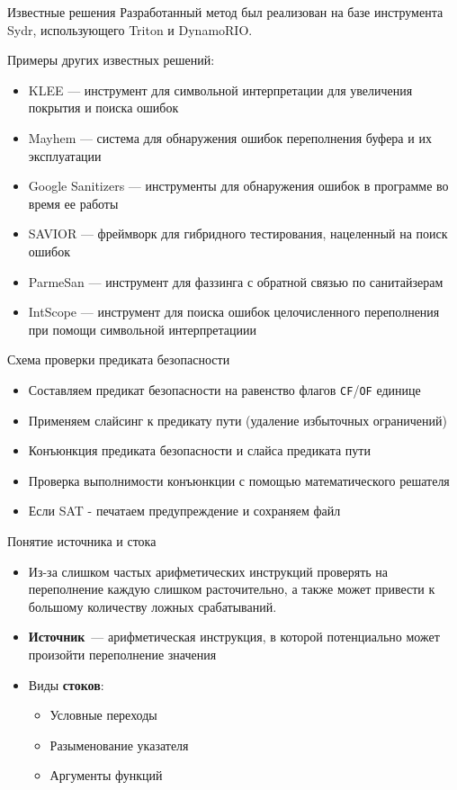 \documentclass[10pt]{beamer}
\begin{document}
\begin{frame}{Известные решения}
Разработанный метод был реализован на базе инструмента Sydr, использующего
Triton и DynamoRIO.

Примеры других известных решений:
\begin{itemize}
    \item KLEE --- инструмент для символьной интерпретации для увеличения
        покрытия и поиска ошибок
    \item Mayhem --- система для обнаружения ошибок переполнения буфера и их
        эксплуатации
    \item Google Sanitizers --- инструменты для обнаружения ошибок в программе
        во время ее работы
    \item SAVIOR --- фреймворк для гибридного тестирования, нацеленный на поиск
        ошибок
    \item ParmeSan --- инструмент для фаззинга с обратной связью по санитайзерам
    \item IntScope --- инструмент для поиска ошибок целочисленного переполнения
        при помощи символьной интерпретациии
\end{itemize}
\end{frame}

\begin{frame}{Схема проверки предиката безопасности}
\begin{itemize}
    \item Составляем предикат безопасности на равенство флагов
        \texttt{CF}/\texttt{OF} единице
    \item Применяем слайсинг к предикату пути (удаление избыточных ограничений)
    \item Конъюнкция предиката безопасности и слайса предиката пути
    \item Проверка выполнимости конъюнкции с помощью математического решателя
    \item Если SAT - печатаем предупреждение и сохраняем файл
\end{itemize}
\end{frame}

\begin{frame}{Понятие источника и стока}
\begin{itemize}
    \item Из-за слишком частых арифметических инструкций проверять на
        переполнение каждую слишком расточительно, а также может привести к
        большому количеству ложных срабатываний.
    \item \textbf{Источник}~--- арифметическая инструкция, в которой потенциально
        может произойти переполнение значения
    \item Виды \textbf{стоков}:
        \begin{itemize}
            \item Условные переходы
            \item Разыменование указателя
            \item Аргументы функций
        \end{itemize}
\end{itemize}
\end{frame}
\end{document}
